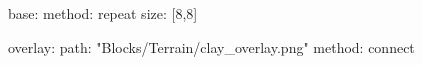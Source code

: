 base:
  method: repeat
  size: [8,8]

overlay:
  path: "Blocks/Terrain/clay_overlay.png"
  method: connect
